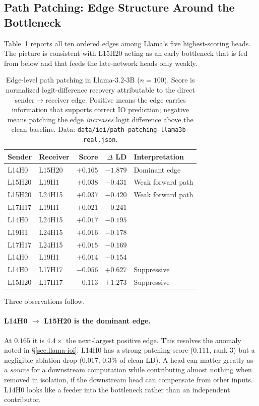 \documentclass[11pt,a4paper]{article}
\begin{document}
\subsection{Path Patching: Edge Structure Around the Bottleneck}
\label{sec:path-results}

Table~\ref{tab:path} reports all ten ordered edges among Llama's five highest-scoring
heads. The picture is consistent with L15H20 acting as an early bottleneck that is fed
from below and that feeds the late-network heads only weakly.

\begin{table}[H]
  \centering
  \caption{Edge-level path patching in Llama-3.2-3B ($n = 100$). Score is normalized
    logit-difference recovery attributable to the direct sender$\to$receiver edge.
    Positive means the edge carries information that supports correct IO prediction;
    negative means patching the edge \emph{increases} logit difference above the clean
    baseline. Data: \texttt{data/ioi/path-patching-llama3b-real.json}.}
  \label{tab:path}
  \smallskip
  \begin{tabular}{llrrl}
    \toprule
    Sender & Receiver & Score & $\Delta$ LD & Interpretation \\
    \midrule
    L14H0  & L15H20 & $+0.165$ & $-1.879$ & Dominant edge \\
    L15H20 & L19H1  & $+0.038$ & $-0.431$ & Weak forward path \\
    L15H20 & L24H15 & $+0.037$ & $-0.420$ & Weak forward path \\
    L17H17 & L19H1  & $+0.021$ & $-0.241$ & \\
    L14H0  & L24H15 & $+0.017$ & $-0.195$ & \\
    L19H1  & L24H15 & $+0.016$ & $-0.178$ & \\
    L17H17 & L24H15 & $+0.015$ & $-0.169$ & \\
    L14H0  & L19H1  & $+0.014$ & $-0.154$ & \\
    L14H0  & L17H17 & $-0.056$ & $+0.627$ & Suppressive \\
    L15H20 & L17H17 & $-0.113$ & $+1.273$ & Suppressive \\
    \bottomrule
  \end{tabular}
\end{table}

Three observations follow.

\paragraph{L14H0 $\to$ L15H20 is the dominant edge.} At $0.165$ it is $4.4\times$ the
next-largest positive edge. This resolves the anomaly noted in
\S\ref{sec:llama-ioi}: L14H0 has a strong patching score ($0.111$, rank 3) but a
negligible ablation drop ($0.017$, $0.3\%$ of clean LD). A head can matter greatly as a
\emph{source} for a downstream computation while contributing almost nothing when
removed in isolation, if the downstream head can compensate from other inputs. L14H0
looks like a feeder into the bottleneck rather than an independent contributor.
\end{document}
